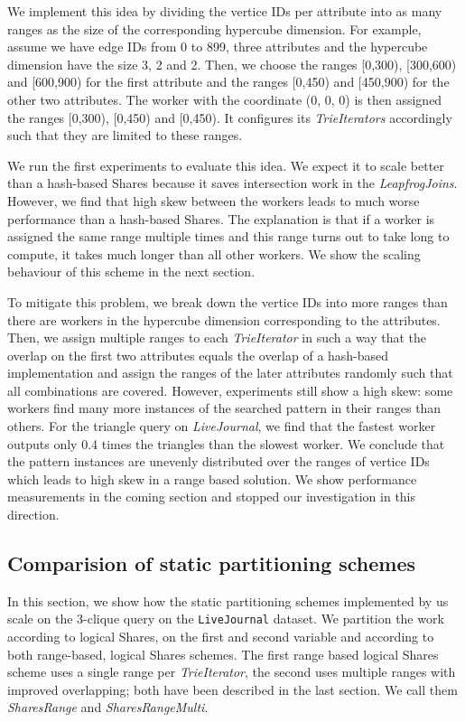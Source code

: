 We implement this idea by dividing the vertice IDs per attribute into as many ranges as the size of the corresponding hypercube dimension.
For example, assume we have edge IDs from 0 to 899, three attributes and the hypercube dimension have the size 3, 2 and 2.
Then, we choose the ranges [0,300), [300,600) and [600,900) for the first attribute and the ranges [0,450) and [450,900) for the other
two attributes.
The worker with the coordinate (0, 0, 0) is then assigned the ranges [0,300), [0,450) and [0,450).
It configures its \textit{TrieIterators} accordingly such that they are limited to these ranges.

We run the first experiments to evaluate this idea.
We expect it to scale better than a hash-based Shares because it saves intersection work in the \textit{LeapfrogJoins}.
However, we find that high skew between the workers leads to much worse performance than a hash-based Shares.
The explanation is that if a worker is assigned the same range multiple times and this range turns out to take long to compute, it takes
much longer than all other workers.
We show the scaling behaviour of this scheme in the next section.

To mitigate this problem, we break down the vertice IDs into more ranges than there are workers in the hypercube dimension corresponding to
the attributes.
Then, we assign multiple ranges to each \textit{TrieIterator} in such a way that the overlap on the first two attributes equals the overlap
of a hash-based implementation and assign the ranges of the later attributes randomly such that all combinations are covered.
However, experiments still show a high skew: some workers find many more instances of the searched pattern in their ranges than others.
For the triangle query on \textit{LiveJournal}, we find that the fastest worker outputs only 0.4 times the triangles than the slowest worker.
We conclude that the pattern instances are unevenly distributed over the ranges of vertice IDs which leads to high skew in
a range based solution.
We show performance measurements in the coming section and stopped our investigation in this direction.


\subsection{Comparision of static partitioning schemes} \label{subsec:statical-partitioning-experiment}
In this section, we show how the static partitioning schemes implemented by us scale on the 3-clique query on the
\texttt{LiveJournal} dataset.
We partition the work according to logical Shares, on the first and second variable and according to both range-based, logical Shares schemes.
The first range based logical Shares scheme uses a single range per \textit{TrieIterator}, the second uses multiple ranges with improved
overlapping;
both have been described in the last section.
We call them \textit{SharesRange} and \textit{SharesRangeMulti}.


